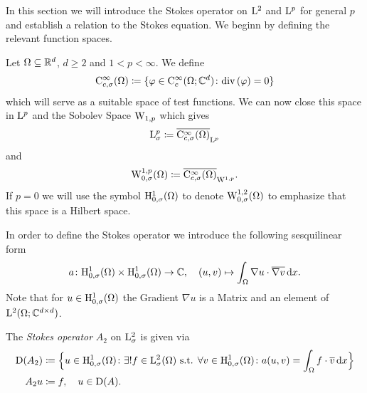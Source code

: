 In this section we will introduce the Stokes operator on $\mathrm{L}^2$ and $\mathrm{L}^p$ for general $p$ and establish a relation to the Stokes equation. 
We beginn by defining the relevant function spaces.

Let $\Omega \subseteq \mathbb{R}^d$, $d \geq 2$ and $1 < p < \infty$. 
We define
\begin{align*}
  \mathrm{C}_{c, \sigma}^\infty(\Omega) \coloneqq \{ \varphi \in \mathrm{C}_c^\infty(\Omega; \mathbb{C}^d) \colon \mathrm{div\,} (\varphi) = 0 \}
\end{align*}
which will serve as a suitable space of test functions.
We can now close this space in $\mathrm{L}^p$ and the Sobolev Space $\mathrm{W}_{1,p}$ which gives
\begin{align*}
  \mathrm{L}_\sigma^p \coloneqq \overline{\mathrm{C}_{c,\sigma}^\infty(\Omega)}_{\mathrm{L}^p}
\end{align*}
and
\begin{align*}
  \mathrm{W}_{0,\sigma}^{1,p}(\Omega) \coloneqq \overline{\mathrm{C}_{c,\sigma}^\infty(\Omega)}_{\mathrm{W}^{1,p}}.
\end{align*}
If $p = 0$ we will use the symbol $\mathrm{H}_{0,\sigma}^1(\Omega)$ to denote $\mathrm{W}_{0,\sigma}^{1,2}(\Omega)$ to emphasize that this space is a Hilbert space.

In order to define the Stokes operator we introduce the following sesquilinear form
\begin{align*}
  a \colon \mathrm{H}_{0,\sigma}^1(\Omega) \times \mathrm{H}_{0,\sigma}^1(\Omega) \to \mathbb{C}, \quad (u,v) \mapsto \int_\Omega \nabla u \cdot \overline{\nabla v} \, {\operatorname{d}\!{x}}.
\end{align*}
Note that for $u \in \mathrm{H}_{0,\sigma}^1(\Omega)$ the Gradient $\nabla u$ is a Matrix and an element of $\mathrm{L}^2(\Omega; \mathbb{C}^{d \times d})$.

\begin{defn}
  The \emph{Stokes operator} $A_2$ on $\mathrm{L}_\sigma^2$ is given via
  \begin{align*}
    \mathrm{D}(A_2) &\coloneqq \Big\{ u \in \mathrm{H}_{0,\sigma}^1(\Omega) \colon \exists ! f \in \mathrm{L}^2_\sigma(\Omega) \text{ s.t. } \forall v \in \mathrm{H}_{0,\sigma}^1(\Omega) \colon a(u,v) = \int_\Omega f \cdot \overline v \, {\operatorname{d}\!{x}} \Big\} \\
    A_2 u &\coloneqq f, \quad  u \in \mathrm{D}(A).
  \end{align*}
\end{defn}


